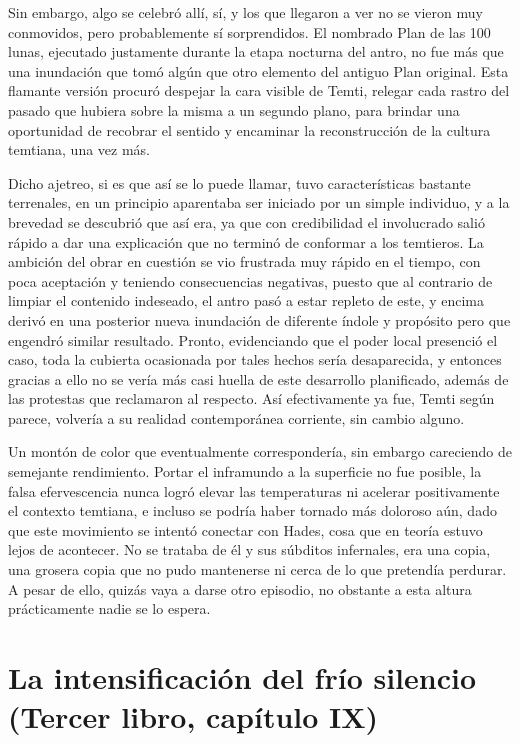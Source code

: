 \documentclass[
]{book}
\begin{document}
Sin embargo, algo se celebró allí, sí, y los que llegaron a ver no se vieron muy conmovidos, pero probablemente sí sorprendidos. El nombrado Plan de las 100 lunas, ejecutado justamente durante la etapa nocturna del antro, no fue más que una inundación que tomó algún que otro elemento del antiguo Plan original. Esta flamante versión procuró despejar la cara visible de Temti, relegar cada rastro del pasado que hubiera sobre la misma a un segundo plano, para brindar una oportunidad de recobrar el sentido y encaminar la reconstrucción de la cultura temtiana, una vez más.

Dicho ajetreo, si es que así se lo puede llamar, tuvo características bastante terrenales, en un principio aparentaba ser iniciado por un simple individuo, y a la brevedad se descubrió que así era, ya que con credibilidad el involucrado salió rápido a dar una explicación que no terminó de conformar a los temtieros. La ambición del obrar en cuestión se vio frustrada muy rápido en el tiempo, con poca aceptación y teniendo consecuencias negativas, puesto que al contrario de limpiar el contenido indeseado, el antro pasó a estar repleto de este, y encima derivó en una posterior nueva inundación de diferente índole y propósito pero que engendró similar resultado. Pronto, evidenciando que el poder local presenció el caso, toda la cubierta ocasionada por tales hechos sería desaparecida, y entonces gracias a ello no se vería más casi huella de este desarrollo planificado, además de las protestas que reclamaron al respecto. Así efectivamente ya fue, Temti según parece, volvería a su realidad contemporánea corriente, sin cambio alguno.

Un montón de color que eventualmente correspondería, sin embargo careciendo de semejante rendimiento. Portar el inframundo a la superficie no fue posible, la falsa efervescencia nunca logró elevar las temperaturas ni acelerar positivamente el contexto temtiana, e incluso se podría haber tornado más doloroso aún, dado que este movimiento se intentó conectar con Hades, cosa que en teoría estuvo lejos de acontecer. No se trataba de él y sus súbditos infernales, era una copia, una grosera copia que no pudo mantenerse ni cerca de lo que pretendía perdurar. A pesar de ello, quizás vaya a darse otro episodio, no obstante a esta altura prácticamente nadie se lo espera.

\hypertarget{la-intensificaciuxf3n-del-fruxedo-silencio-tercer-libro-capuxedtulo-ix}{%
\section{La intensificación del frío silencio (Tercer libro, capítulo IX)}\label{la-intensificaciuxf3n-del-fruxedo-silencio-tercer-libro-capuxedtulo-ix}}
\end{document}
